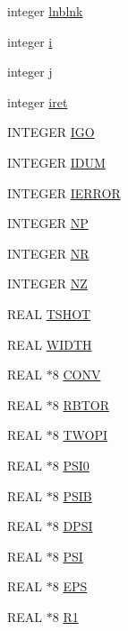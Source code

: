 \begin{CompactItemize}
\item 
integer \hyperlink{namespaceJETPPF2DG_407321de285e0bcd8e697236b9c7a990}{lnblnk}
\item 
integer \hyperlink{namespaceJETPPF2DG_cd9af8b5846f3015549a65dac27297d6}{i}
\item 
integer \hyperlink{namespaceJETPPF2DG_8b427254180dae4e03e464db25432b89}{j}
\item 
integer \hyperlink{namespaceJETPPF2DG_8a10d0fb8a6fcf0b1735d5264e4074c6}{iret}
\item 
INTEGER \hyperlink{namespaceJETPPF2DG_6fcf8fd1ddd7d7d89f9ebc42bb0acd4d}{IGO}
\item 
INTEGER \hyperlink{namespaceJETPPF2DG_525296fd37a70f64b96687ac65d85e15}{IDUM}
\item 
INTEGER \hyperlink{namespaceJETPPF2DG_7d9dd11fba52d0b1b824c1d55e435c0f}{IERROR}
\item 
INTEGER \hyperlink{namespaceJETPPF2DG_fc3e107505ebc9c764214d171a22c579}{NP}
\item 
INTEGER \hyperlink{namespaceJETPPF2DG_177fa052b15bf74d1b04fa4c6d0d246d}{NR}
\item 
INTEGER \hyperlink{namespaceJETPPF2DG_54b52cca10f228100e5bf6d6861b5744}{NZ}
\item 
REAL \hyperlink{namespaceJETPPF2DG_40cdb8daca293ee227018204f477a568}{TSHOT}
\item 
REAL \hyperlink{namespaceJETPPF2DG_eeb6ada756a20d433b90d04807324eec}{WIDTH}
\item 
REAL $\ast$8 \hyperlink{namespaceJETPPF2DG_cc9d3570fc86b09342a8977a84c9b1e6}{CONV}
\item 
REAL $\ast$8 \hyperlink{namespaceJETPPF2DG_54f18c6794b7739b7bc332cedd97d7f1}{RBTOR}
\item 
REAL $\ast$8 \hyperlink{namespaceJETPPF2DG_0071ea355e749981556deb6108904af9}{TWOPI}
\item 
REAL $\ast$8 \hyperlink{namespaceJETPPF2DG_0aea03eeb6f87047b94e1a0b718253af}{PSI0}
\item 
REAL $\ast$8 \hyperlink{namespaceJETPPF2DG_e557339a1c12ba7e9ef7deadc7465739}{PSIB}
\item 
REAL $\ast$8 \hyperlink{namespaceJETPPF2DG_fbb4fcc942fe28a23b23a8667d562b48}{DPSI}
\item 
REAL $\ast$8 \hyperlink{namespaceJETPPF2DG_b093dcbbe39feeaa433796831d6374de}{PSI}
\item 
REAL $\ast$8 \hyperlink{namespaceJETPPF2DG_9bcf5731b1080d6e8a268dc44d2c30a0}{EPS}
\item 
REAL $\ast$8 \hyperlink{namespaceJETPPF2DG_a8c481ce2a9d8fee1b017a02d4bf7504}{R1}

\end{CompactItemize}
